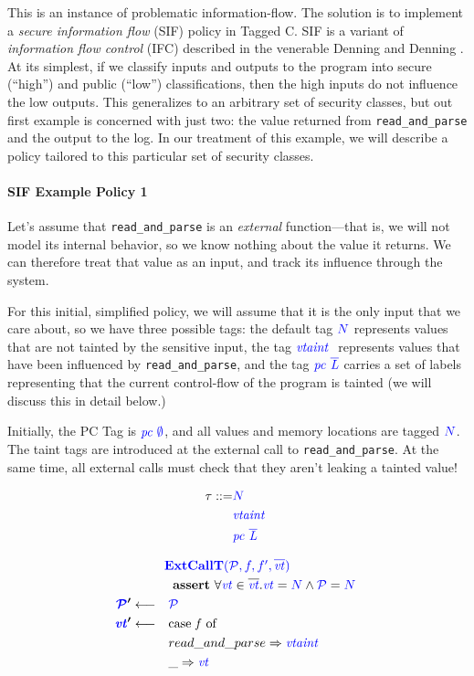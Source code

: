 \documentclass[acmsmall,review,anonymous]{acmart}\settopmatter{printfolios=true,printccs=false,printacmref=false}
\begin{document}
This is an instance of problematic information-flow. The solution is to implement
a {\em secure information flow} (SIF) policy in Tagged C. SIF is a variant of
{\em information flow control} (IFC) described in the venerable Denning and Denning
\cite{Denning77:SecureInformationFlow}. At its simplest, if we classify inputs and outputs to
the program into secure (``high'') and public (``low'') classifications, then the
high inputs do not influence the low outputs. This generalizes to an arbitrary set
of security classes, but out first example is concerned with just two: the value
returned from {\tt read\_and\_parse} and the output to the log.
In our treatment of this example, we will describe a policy tailored to this particular
set of security classes.

\paragraph*{SIF Example Policy 1}

Let's assume that {\tt read\_and\_parse} is an {\em external} function---that is, we will not
model its internal behavior, so we know nothing about the value it returns. We can therefore
treat that value as an input, and track its influence through the system.

For this initial, simplified policy, we will assume that it is the only input that we care about,
so we have three possible tags: the default tag
\({\color{blue} N}\) represents values that are not tainted by the sensitive input, the tag
\(\mathit{\color{blue} vtaint ~ }\) represents values that have been influenced by {\tt read\_and\_parse}, and the tag
\(\mathit{\color{blue} pc ~ \overline{L}}\) carries a set of labels representing that
the current control-flow of the program is tainted (we will discuss this in detail
below.)

Initially, the PC Tag is \(\mathit{\color{blue} pc ~ \emptyset}\), and all values and memory locations are
tagged \({\color{blue} N}\). The taint tags are introduced at the external call to {\tt read\_and\_parse}.
At the same time, all external calls must check that they aren't leaking a tainted value!

\begin{minipage}{0.25\textwidth}
{ \color{blue}
  \begin{align*}
    \tau ::= & {\color{blue} N} \\
    & \mathit{\color{blue} vtaint ~ } \\
    & \mathit{\color{blue} pc ~ \overline{L}} \\
\end{align*} }
\end{minipage}
\begin{minipage}{0.74\textwidth}
\[\begin{aligned}
\truledef{\extcallt}
\assert{\forall \vt \in \overline{\vt} . \vt = \N \land \PCT = \N}
\settag{\PCT'}{\PCT}
\settag{\vt'}{\caseof{f}}
\caseentry{read\_and\_parse}{\vtaint{}} \\
\caseentry{\_}{\vt} \\
\end{aligned}\]
\end{minipage}
\end{document}
